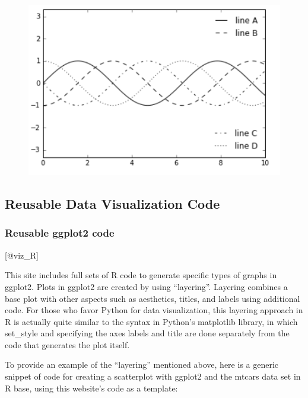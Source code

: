 \documentclass[]{book}
\theoremstyle{definition}
\theoremstyle{definition}
\theoremstyle{definition}
\theoremstyle{remark}
\begin{document}
\begin{figure}
\centering
\includegraphics{images/legend5.png}
\caption{}
\end{figure}

\subsection{Reusable Data Visualization
Code}\label{reusable-data-visualization-code}

\subsubsection{Reusable ggplot2 code}\label{reusable-ggplot2-code}

{[}@viz\_R{]}

This site includes full sets of R code to generate specific types of
graphs in ggplot2. Plots in ggplot2 are created by using ``layering''.
Layering combines a base plot with other aspects such as aesthetics,
titles, and labels using additional code. For those who favor Python for
data visualization, this layering approach in R is actually quite
similar to the syntax in Python's matplotlib library, in which
set\_style and specifying the axes labels and title are done separately
from the code that generates the plot itself.

To provide an example of the ``layering'' mentioned above, here is a
generic snippet of code for creating a scatterplot with ggplot2 and the
mtcars data set in R base, using this website's code as a template:
\end{document}
